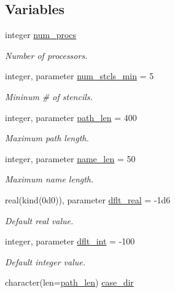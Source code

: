 \subsection*{Variables}
\begin{DoxyCompactItemize}
\item 
integer \hyperlink{namespacem__global__parameters_aafb65952c33f1c363d1040bde29734ea}{num\+\_\+procs}
\begin{DoxyCompactList}\small\item\em Number of processors. \end{DoxyCompactList}\item 
integer, parameter \hyperlink{namespacem__global__parameters_a71f091e6074e6c248fd7e03218b89218}{num\+\_\+stcls\+\_\+min} = 5
\begin{DoxyCompactList}\small\item\em Mininum \# of stencils. \end{DoxyCompactList}\item 
integer, parameter \hyperlink{namespacem__global__parameters_aa9d578c318044b2f2ec990b5fc0dfab9}{path\+\_\+len} = 400
\begin{DoxyCompactList}\small\item\em Maximum path length. \end{DoxyCompactList}\item 
integer, parameter \hyperlink{namespacem__global__parameters_ac8252b115e717c6f1c8595be6f897df7}{name\+\_\+len} = 50
\begin{DoxyCompactList}\small\item\em Maximum name length. \end{DoxyCompactList}\item 
real(kind(0d0)), parameter \hyperlink{namespacem__global__parameters_a99ba7e33a1870ac89386d376e0d20526}{dflt\+\_\+real} = -\/1d6
\begin{DoxyCompactList}\small\item\em Default real value. \end{DoxyCompactList}\item 
integer, parameter \hyperlink{namespacem__global__parameters_a4e4e3806190a62a77cf6542f6d07dbbd}{dflt\+\_\+int} = -\/100
\begin{DoxyCompactList}\small\item\em Default integer value. \end{DoxyCompactList}\item 
character(len=\hyperlink{namespacem__global__parameters_aa9d578c318044b2f2ec990b5fc0dfab9}{path\+\_\+len}) \hyperlink{namespacem__global__parameters_a0b91e533fe3b3e112c42af4024014544}{case\+\_\+dir}

\end{DoxyCompactItemize}
